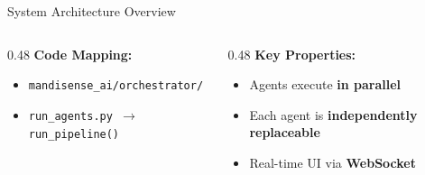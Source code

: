 \documentclass[aspectratio=169]{beamer}
\begin{document}
\begin{frame}{System Architecture Overview}
\begin{tikzpicture}[node distance=0.5cm and 0.3cm, scale=0.9, transform shape]
\end{tikzpicture}

\vspace{0.15cm}
\begin{columns}[T]
  \begin{column}{0.48\textwidth}
    \textbf{Code Mapping:}
    \begin{itemize}
      \item \texttt{mandisense\_ai/orchestrator/}
      \item \texttt{run\_agents.py $\to$ run\_pipeline()}
    \end{itemize}
  \end{column}
  \begin{column}{0.48\textwidth}
    \textbf{Key Properties:}
    \begin{itemize}
      \item Agents execute \textbf{in parallel}
      \item Each agent is \textbf{independently replaceable}
      \item Real-time UI via \textbf{WebSocket}
    \end{itemize}
  \end{column}
\end{columns}
\end{frame}
\end{document}
